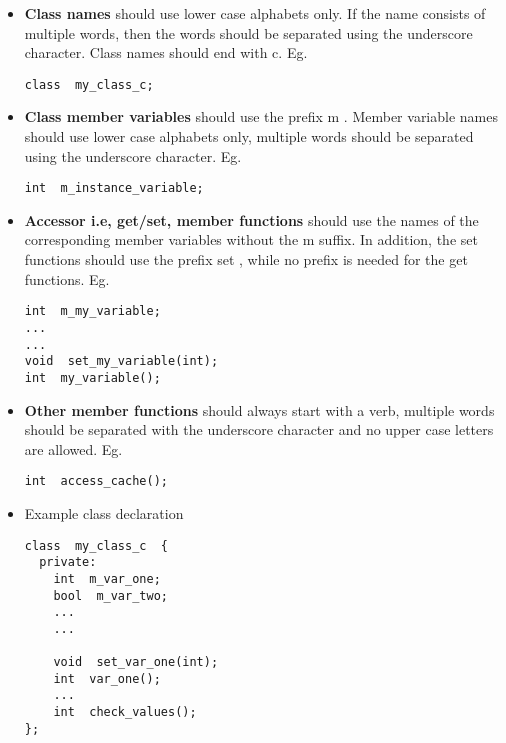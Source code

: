 \begin{itemize}

  \item \textbf{Class names} should use lower case alphabets only.  If the name
consists of multiple words, then the words should be separated using
the underscore character. Class names should end with c.  Eg.

\begin{Verbatim}
class  my_class_c;
\end{Verbatim}


  \item \textbf{Class member variables} should use the prefix m .  Member variable
names should use lower case alphabets only, multiple words should be
separated using the underscore character.  Eg.

\begin{Verbatim}
int  m_instance_variable;
\end{Verbatim}


  \item \textbf{Accessor i.e, get/set, member functions} should use
the names of the corresponding member variables without the m
suffix. In addition, the set functions should use the prefix set ,
while no prefix is needed for the get functions.  Eg.


\begin{Verbatim}
int  m_my_variable;
...
...
void  set_my_variable(int);
int  my_variable();
\end{Verbatim}


  \item \textbf{Other member functions} should always start with a
verb, multiple words should be separated with the underscore character
and no upper case letters are allowed.  Eg.

\begin{Verbatim}
int  access_cache();
\end{Verbatim}


  \item Example class declaration

\begin{Verbatim}
class  my_class_c  {
  private:
    int  m_var_one;
    bool  m_var_two;
    ...
    ...

    void  set_var_one(int);
    int  var_one();
    ...
    int  check_values();
};
\end{Verbatim}

\end{itemize}





